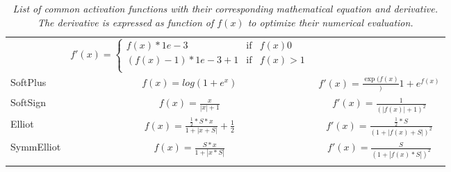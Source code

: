 \documentclass[12pt,a4paper]{report}
\begin{document}
\begin{table}
\begin{adjustbox}{max width=\textwidth}
\begin{tabular}{lcc}
                                                    &  $f'(x) = \left\{\begin{array}{rlr}
                                                                        f(x) * 1e-3           & \mbox{if} & f(x) 0    \\
                                                                        (f(x) - 1) * 1e-3 + 1 & \mbox{if} & f(x) > 1  \\
                                                                        \end{array}\right.$                           \\

SoftPlus &  $f(x) = log(1 + e^{x})$                 &  $f'(x) = \frac{\exp(f(x)}){1 + e^{f(x)}}$ \\

SoftSign &  $f(x) = \frac{x}{|x| + 1}$              &  $f'(x) = \frac{1}{(|f(x)| + 1)^{2}}$ \\

Elliot   &  $f(x) = \frac{\frac{1}{2} * S * x}{1 + |x + S|} + \frac{1}{2}$

                                                    &  $f'(x) = \frac{\frac{1}{2} * S}{(1 + |f(x) + S|)^{2}} $ \\

SymmElliot &  $f(x) = \frac{S * x}{1 + |x * S|}$    &  $f'(x) = \frac{S}{(1 + |f(x) * S|)^{2}}$ \\





\hline\\
\end{tabular}
\end{adjustbox}
\caption{\it List of common activation functions with their corresponding mathematical equation and derivative.
The derivative is expressed as function of $f(x)$ to optimize their numerical evaluation.
}
\label{tab:activations}
\end{table}
\end{document}
